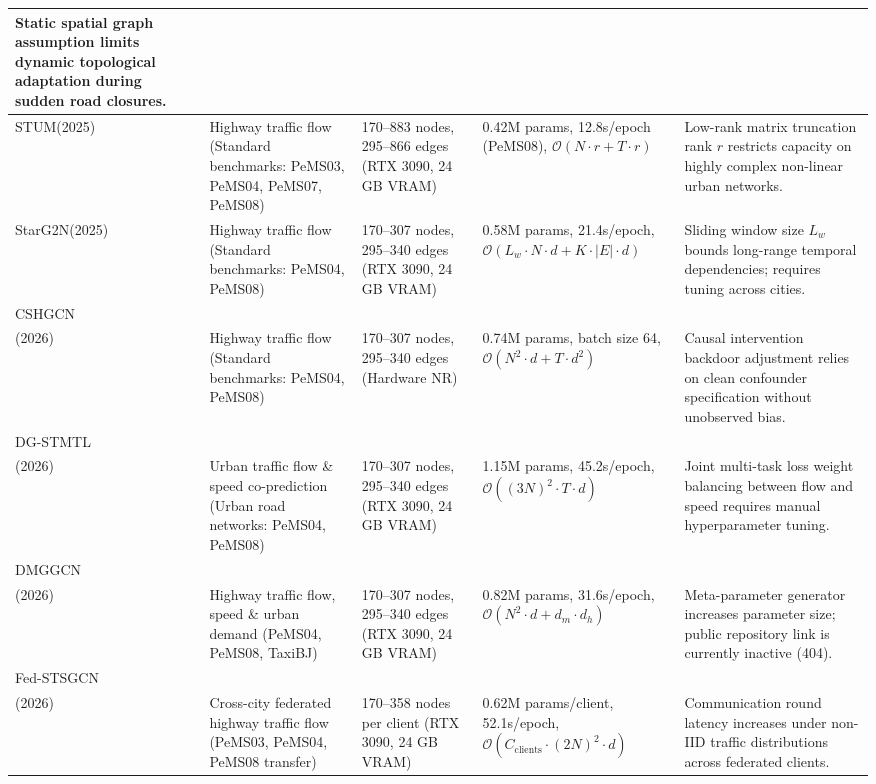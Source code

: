 \begin{longtable}{p{1.5cm} p{2.25cm} p{2.25cm} p{2.25cm} p{2.25cm}}
Static spatial graph assumption limits dynamic topological adaptation during sudden road closures. \\
\hline
STUM(2025) ~\cite{ruan_cross_2025} &
Highway traffic flow (Standard benchmarks: PeMS03, PeMS04, PeMS07, PeMS08) &
170--883 nodes, 295--866 edges (RTX 3090, 24 GB VRAM) &
0.42M params, 12.8s/epoch (PeMS08), $\mathcal{O}(N \cdot r + T \cdot r)$ &
Low-rank matrix truncation rank $r$ restricts capacity on highly complex non-linear urban networks. \\
\hline
StarG2N(2025) ~\cite{zhao2025starg2n} &
Highway traffic flow (Standard benchmarks: PeMS04, PeMS08) &
170--307 nodes, 295--340 edges (RTX 3090, 24 GB VRAM) &
0.58M params, 21.4s/epoch, $\mathcal{O}(L_w \cdot N \cdot d + K \cdot |E| \cdot d)$ &
Sliding window size $L_w$ bounds long-range temporal dependencies; requires tuning across cities. \\
\hline
\pagebreak[4]
CSHGCN\\(2026) ~\cite{hu2026causal} &
Highway traffic flow (Standard benchmarks: PeMS04, PeMS08) &
170--307 nodes, 295--340 edges (Hardware NR) &
0.74M params, batch size 64, $\mathcal{O}(N^2 \cdot d + T \cdot d^2)$ &
Causal intervention backdoor adjustment relies on clean confounder specification without unobserved bias. \\
\hline
DG-STMTL\\(2026) ~\cite{cui2025dg} &
Urban traffic flow \& speed co-prediction (Urban road networks: PeMS04, PeMS08) &
170--307 nodes, 295--340 edges (RTX 3090, 24 GB VRAM) &
1.15M params, 45.2s/epoch, $\mathcal{O}((3N)^2 \cdot T \cdot d)$ &
Joint multi-task loss weight balancing between flow and speed requires manual hyperparameter tuning. \\
\hline
DMGGCN\\(2026) ~\cite{deng2026dynamic} &
Highway traffic flow, speed \& urban demand (PeMS04, PeMS08, TaxiBJ) &
170--307 nodes, 295--340 edges (RTX 3090, 24 GB VRAM) &
0.82M params, 31.6s/epoch, $\mathcal{O}(N^2 \cdot d + d_m \cdot d_h)$ &
Meta-parameter generator increases parameter size; public repository link is currently inactive (404). \\
\hline
Fed-STSGCN\\(2026) ~\cite{yu2026federated} &
Cross-city federated highway traffic flow (PeMS03, PeMS04, PeMS08 transfer) &
170--358 nodes per client (RTX 3090, 24 GB VRAM) &
0.62M params/client, 52.1s/epoch, $\mathcal{O}(C_{\text{clients}} \cdot (2N)^2 \cdot d)$ &
Communication round latency increases under non-IID traffic distributions across federated clients. \\

\end{longtable}
